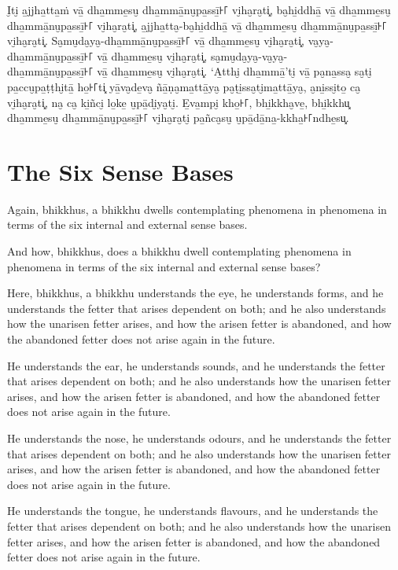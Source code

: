 I̮ti̮ a̱jjha̱tta̱ṁ vā̱ dha̱mme̱su̮ dha̱mmā̱nu̮pa̱ssī̱꜔꜒ vi̮ha̮ra̮ti͓,
ba̮hi̱ddhā̱ vā̱ dha̱mme̱su̮ dha̱mmā̱nu̮pa̱ssī̱꜔꜒ vi̮ha̮ra̮ti͓,
a̱jjha̱tta̮-ba̮hi̱ddhā̱ vā̱ dha̱mme̱su̮ dha̱mmā̱nu̮pa̱ssī̱꜔꜒ vi̮ha̮ra̮ti͓.
Sa̮mu̮da̮ya̮-dha̱mmā̱nu̮pa̱ssī̱꜔꜒ vā̱ dha̱mme̱su̮ vi̮ha̮ra̮ti͓,
va̮ya̮-dha̱mmā̱nu̮pa̱ssī̱꜔꜒ vā̱ dha̱mme̱su̮ vi̮ha̮ra̮ti͓,
sa̮mu̮da̮ya̮-va̮ya̮-\\ dha̱mmā̱nu̮pa̱ssī̱꜔꜒ vā̱ dha̱mme̱su̮ vi̮ha̮ra̮ti͓.
‘A̱tthi̮ dha̱mmā̱’ti̮ vā̱ pa̮na̱ssa̮ sa̮ti̮ pa̱ccu̮pa̱ṭṭhi̮tā̱ ho̱꜔꜒ti͓
yā̱va̮de̱va̮ ñā̱ṇa̮ma̱ttā̱ya̮ pa̮ṭi̱ssa̮ti̮ma̱ttā̱ya̮, a̮ni̱ssi̮to̱ ca̮ vi̮ha̮ra̮ti͓,
na̮ ca̮ ki̱ñci̮ lo̱ke̱ u̮pā̱di̮ya̮ti̮. E̱va̱mpi̮ kho̱꜔꜒, bhi̱kkha̮ve̱, bhi̱kkhu͓
dha̱mme̱su̮ dha̱mmā̱nu̮pa̱ssī̱꜔꜒ vi̮ha̮ra̮ti̮ pa̱ñca̮su̮ u̮pā̱dā̱na̱-kkha̱꜔꜒ndhe̱su͓.


\englishPage
\section{The Six Sense Bases}

Again, bhikkhus, a bhikkhu dwells contemplating phenomena in phenomena in terms
of the six internal and external sense bases.

And how, bhikkhus, does a bhikkhu dwell contemplating phenomena in phenomena in
terms of the six internal and external sense bases?

Here, bhikkhus, a bhikkhu understands the eye, he understands forms, and he
understands the fetter that arises dependent on both; and he also understands
how the unarisen fetter arises, and how the arisen fetter is abandoned, and how
the abandoned fetter does not arise again in the future.

He understands the ear, he understands sounds, and he understands the fetter
that arises dependent on both; and he also understands how the unarisen fetter
arises, and how the arisen fetter is abandoned, and how the abandoned fetter
does not arise again in the future.

He understands the nose, he understands odours, and he understands the fetter
that arises dependent on both; and he also understands how the unarisen fetter
arises, and how the arisen fetter is abandoned, and how the abandoned fetter
does not arise again in the future.

He understands the tongue, he understands flavours, and he understands the
fetter that arises dependent on both; and he also understands how the unarisen
fetter arises, and how the arisen fetter is abandoned, and how the abandoned
fetter does not arise again in the future.

